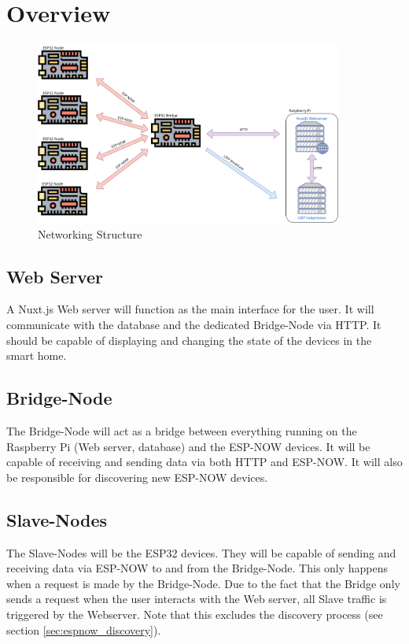 \section{Overview}

    \begin{figure}[H]
        \centering
        \includegraphics[width=0.9\textwidth]{topics/flowcharts/Networking.png}
        \caption{Networking Structure}
    \end{figure}
    \subsection{Web Server}
    A Nuxt.js Web server will function as the main interface
    for the user. It will communicate with the database and the
    dedicated Bridge-Node via HTTP. It should be capable of displaying
    and changing the state of the devices in the smart home.
    \subsection{Bridge-Node}
    The Bridge-Node will act as a bridge between everything running
    on the Raspberry Pi (Web server, database) and the ESP-NOW devices.
    It will be capable of receiving and sending data via both HTTP and
    ESP-NOW. It will also be responsible for discovering new ESP-NOW
    devices.
    \subsection{Slave-Nodes}
    The Slave-Nodes will be the ESP32 devices. They will be capable of
    sending and receiving data via ESP-NOW to and from the Bridge-Node.
    This only happens when a request is made by the Bridge-Node. Due to 
    the fact that the Bridge only sends a request when the user interacts
    with the Web server, all Slave traffic is triggered by the Webserver.
    Note that this excludes the discovery process (see section \ref{sec:espnow_discovery}).
